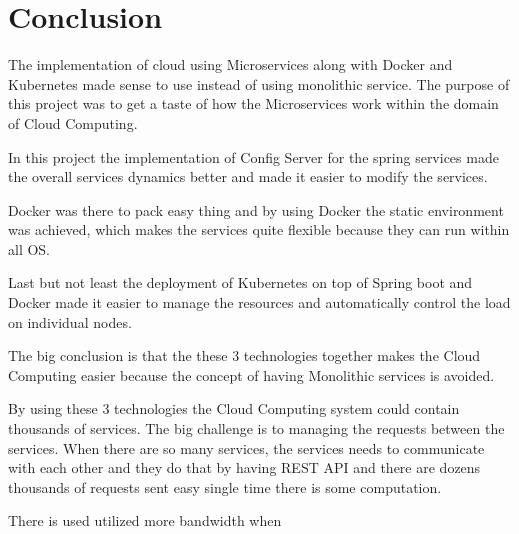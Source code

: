 \chapter{Conclusion}\label{ch:conclusion}

The implementation of cloud using Microservices along with Docker and Kubernetes made sense to use instead of using monolithic service. The purpose of this project was to get a taste of how the Microservices work within the domain of Cloud Computing. 

In this project the implementation of Config Server for the spring services made the overall services dynamics better and made it easier to modify the services. 

Docker was there to pack easy thing and by using Docker the static environment was achieved, which makes the services quite flexible because they can run within all OS. 

Last but not least the deployment of Kubernetes on top of Spring boot and Docker made it easier to manage the resources and automatically control the load on individual nodes. 

The big conclusion is that the these 3 technologies together makes the Cloud Computing easier because the concept of having Monolithic services is avoided. 

By using these 3 technologies the Cloud Computing system could contain thousands of services. The big challenge is to managing the requests between the services. When there are so many services, the services needs to communicate with each other and they do that by having REST API and there are dozens thousands of requests sent easy single time there is some computation. 

There is used utilized more bandwidth when 